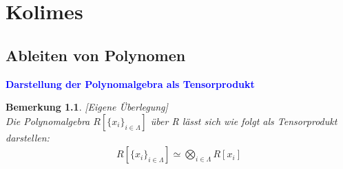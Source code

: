 \documentclass[10pt,a4paper]{report}
\newcounter{Aussage}[chapter]
\newtheorem{bem}[Aussage]{Bemerkung}
\begin{document}
\chapter{Kolimes}
\section{Ableiten von Polynomen}

\textcolor{blue}{\textbf{Darstellung der Polynomalgebra als Tensorprodukt}}
\begin{bem}\label{Darstellung der Polynomalgebra als Tensorprodukt}\textit{[Eigene Überlegung]}\\
Die Polynomalgebra $R[\lbrace x_i \rbrace_{i \in \Lambda}]$ über R lässt sich wie folgt als Tensorprodukt darstellen:
\begin{gather*}
R[\lbrace x_i \rbrace_{i \in  \Lambda}] \simeq \bigotimes_{i \in \Lambda} R[x_i]
\end{gather*}
\end{bem}
\end{document}
